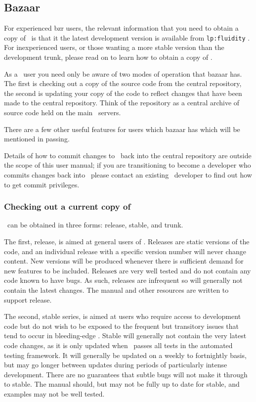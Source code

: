\subsection{Bazaar}
\label{sec:bazaar}

For experienced bzr users, the relevant information that you need to
obtain a copy of \fluidity\ is that it the latest development version is
available from
\lstinline[language=Bash]+lp:fluidity+ .  For
inexperienced users, or those wanting a more stable version than the
development trunk, please read on to learn how to obtain a copy of \fluidity.

As a \fluidity\ user you need only be aware of two modes of operation that
bazaar has. The first is checking out a copy of the source code from the
central repository, the second is updating your copy of the code to reflect
changes that have been made to the central repository. Think of the repository
as a central archive of source code held on the main \fluidity\ servers.

There are a few other useful features for users which bazaar has which will be
mentioned in passing.

Details of how to commit changes to \fluidity\ back into the central repository
are outside the scope of this user manual; if you are transitioning to become a
developer who commits changes back into \fluidity\ please contact an existing
\fluidity\ developer to find out how to get commit privileges.

\subsubsection{Checking out a current copy of \fluidity}
\label{sec:subversion_checkout_current}

\fluidity\ can be obtained in three forms: release, stable, and trunk.

The first, release, is aimed at general users of \fluidity. Releases are static
versions of the code, and an individual release with a specific version number
will never change content. New versions will be produced whenever there is
sufficient demand for new features to be included. Releaseѕ are very well
tested and do not contain any code known to have bugs. As such, releases are
infrequent so will generally not contain the latest changes. The manual and
other resources are written to support release.

The second, stable series, is aimed at users who require access to development
code but do not wish to be exposed to the frequent but transitory issues that
tend to occur in bleeding-edge \fluidity. Stable will generally not contain the
very latest code changes, as it is only updated when \fluidity\ passes all
tests in the automated testing framework. It will generally be updated on a
weekly to fortnightly basis, but may go longer between updates during periods
of particularly intense development. There are no guarantees that subtle bugs
will not make it through to stable. The manual should, but may not be fully up
to date for stable, and examples may not be well tested.

